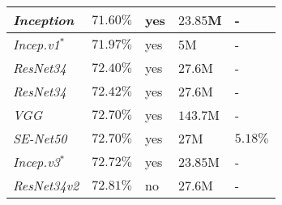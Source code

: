 \documentclass[fleqn,10pt]{SelfArx}
\begin{document}
\begin{center}
\begin{tabular}{||p{2.2cm} | p{1.3cm} | p{0.7cm} | p{1.2cm} | p{0.8cm}||}
\hline
\hline
\textit{Inception}\cite{pramerdorfer2016facial}       & \hspace{0.15cm}$71.60\%$               & \hspace{0.12cm}yes   & \hspace{0.05cm}$23.85$M & \hspace{0.4cm}-\\
\hline
\hline
\textit{Incep.v1}\cite{resmaskingnet}$^{*}$       & \hspace{0.15cm}$71.97\%$               & \hspace{0.12cm}yes   & \hspace{0.32cm}$5$M & \hspace{0.4cm}-\\
\hline
\hline
\textit{ResNet34}\cite{pramerdorfer2016facial}       & \hspace{0.15cm}$72.40\%$               & \hspace{0.12cm}yes   & \hspace{0.12cm}$27.6$M & \hspace{0.4cm}-\\
\hline
\hline
\textit{ResNet34}\cite{resmaskingnet}       & \hspace{0.15cm}$72.42\%$               & \hspace{0.12cm}yes   & \hspace{0.12cm}$27.6$M & \hspace{0.4cm}-\\
\hline
\hline
\textit{VGG}\cite{pramerdorfer2016facial}       & \hspace{0.15cm}$72.70\%$               & \hspace{0.12cm}yes   & \hspace{0.05cm}$143.7$M & \hspace{0.4cm}-\\
\hline
\hline
\textit{SE-Net50}\cite{khanzada2020facial}       & \hspace{0.15cm}$72.70\%$               & \hspace{0.12cm}yes   & \hspace{0.27cm}$27$M & $5.18\%$\\
\hline
\hline
\textit{Incep.v3}\cite{resmaskingnet}$^{*}$       & \hspace{0.15cm}$72.72\%$               & \hspace{0.12cm}yes   & \hspace{0.05cm}$23.85$M & \hspace{0.4cm}-\\
\hline
\hline
\textit{ResNet34v2}       & \hspace{0.15cm}$72.81\%$               & \hspace{0.15cm}no   & \hspace{0.12cm}27.6M & \hspace{0.4cm}-\\

\end{tabular}
\end{center}
\end{document}
